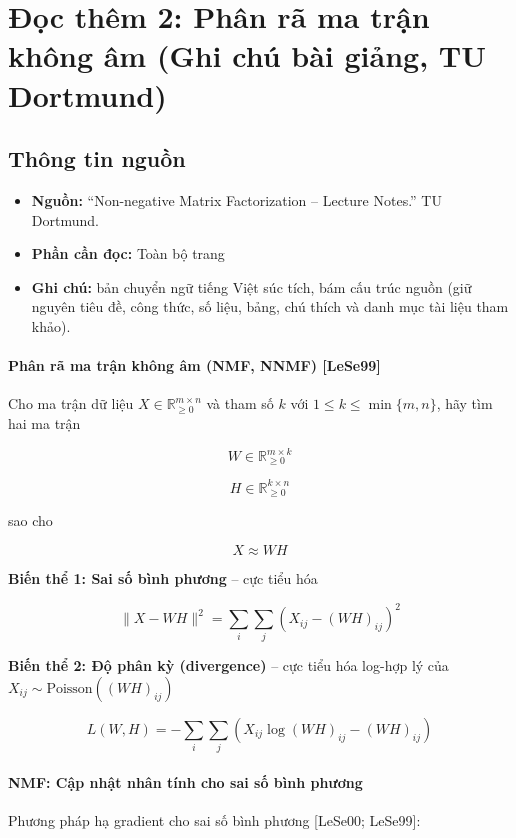 \chapter{Đọc thêm 2: Phân rã ma trận không âm (Ghi chú bài giảng, TU Dortmund)}
\label{ch:M5L1DocThem2}

\section{Thông tin nguồn}

\begin{itemize}
  \item \textbf{Nguồn:} ``Non-negative Matrix Factorization -- Lecture Notes.'' TU Dortmund.
  \item \textbf{Phần cần đọc:} Toàn bộ trang
  \item \textbf{Ghi chú:} bản chuyển ngữ tiếng Việt súc tích, bám cấu trúc nguồn (giữ nguyên tiêu đề, công thức, số liệu, bảng, chú thích và danh mục tài liệu tham khảo).
\end{itemize}

\subsubsection{Phân rã ma trận không âm (NMF, NNMF) {[}LeSe99{]}}

Cho ma trận dữ liệu \(X \in \mathbb{R}^{m \times n}_{\ge 0}\) và tham số \(k\) với \(1 \le k \le \min\{m, n\}\), hãy tìm hai ma trận

\[W \in \mathbb{R}^{m \times k}_{\ge 0}\]

\[H \in \mathbb{R}^{k \times n}_{\ge 0}\]

sao cho

\[X \approx WH\]

\textbf{Biến thể 1: Sai số bình phương} -- cực tiểu hóa

\[\|X - WH\|^2 = \sum_i \sum_j \left(X_{ij} - (WH)_{ij}\right)^2\]

\textbf{Biến thể 2: Độ phân kỳ (divergence)} -- cực tiểu hóa log-hợp lý của \(X_{ij} \sim \text{Poisson}\left((WH)_{ij}\right)\)

\[L(W, H) = -\sum_i \sum_j \left(X_{ij} \log (WH)_{ij} - (WH)_{ij}\right)\]

\subsubsection{NMF: Cập nhật nhân tính cho sai số bình phương}

Phương pháp hạ gradient cho sai số bình phương {[}LeSe00; LeSe99{]}:

